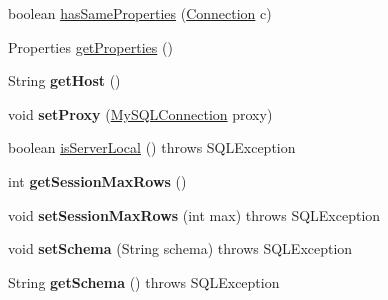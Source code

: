 \begin{DoxyCompactItemize}
\item 
boolean \mbox{\hyperlink{interfacecom_1_1mysql_1_1jdbc_1_1_connection_aa075b035aedfaf2d59114dde53cfc3de}{has\+Same\+Properties}} (\mbox{\hyperlink{interfacecom_1_1mysql_1_1jdbc_1_1_connection}{Connection}} c)
\item 
Properties \mbox{\hyperlink{interfacecom_1_1mysql_1_1jdbc_1_1_connection_ad594d416be84166aff54270aa66b3d71}{get\+Properties}} ()
\item 
\mbox{\label{interfacecom_1_1mysql_1_1jdbc_1_1_connection_a41423d76b439105dc527b301f82ded6b}} 
String {\bfseries get\+Host} ()
\item 
\mbox{\label{interfacecom_1_1mysql_1_1jdbc_1_1_connection_aed185ac0017f766b5d2ec1efa253c2a9}} 
void {\bfseries set\+Proxy} (\mbox{\hyperlink{interfacecom_1_1mysql_1_1jdbc_1_1_my_s_q_l_connection}{My\+S\+Q\+L\+Connection}} proxy)
\item 
boolean \mbox{\hyperlink{interfacecom_1_1mysql_1_1jdbc_1_1_connection_a37eb25137505b9aaf4b25a847f87e949}{is\+Server\+Local}} ()  throws S\+Q\+L\+Exception
\item 
\mbox{\label{interfacecom_1_1mysql_1_1jdbc_1_1_connection_a498b0d9e391a207f2eeba1713d722237}} 
int {\bfseries get\+Session\+Max\+Rows} ()
\item 
\mbox{\label{interfacecom_1_1mysql_1_1jdbc_1_1_connection_ab18a1ee76cb6c4a6c059c6df88a8e9b6}} 
void {\bfseries set\+Session\+Max\+Rows} (int max)  throws S\+Q\+L\+Exception
\item 
\mbox{\label{interfacecom_1_1mysql_1_1jdbc_1_1_connection_a0de4108be3a1be26ecb58e596dd20a7e}} 
void {\bfseries set\+Schema} (String schema)  throws S\+Q\+L\+Exception
\item 
\mbox{\label{interfacecom_1_1mysql_1_1jdbc_1_1_connection_a752fd4d24ae4844995c64c1417094219}} 
String {\bfseries get\+Schema} ()  throws S\+Q\+L\+Exception
\item 
\mbox{\label{interfacecom_1_1mysql_1_1jdbc_1_1_connection_a15bd2b2930c0d761bbfb7d2ee9507448}} 

\end{DoxyCompactItemize}
